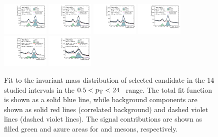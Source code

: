 \begin{figure}
    \includegraphics[width=0.2\textwidth]{Figures/Chapter 5/inv_mass/pt_4.5_5.0.pdf}
    \includegraphics[width=0.2\textwidth]{Figures/Chapter 5/inv_mass/pt_5.0_5.5.pdf}
    \includegraphics[width=0.2\textwidth]{Figures/Chapter 5/inv_mass/pt_5.5_6.0.pdf}
    \includegraphics[width=0.2\textwidth]{Figures/Chapter 5/inv_mass/pt_6.0_8.0.pdf}
    \includegraphics[width=0.2\textwidth]{Figures/Chapter 5/inv_mass/pt_8.0_12.0.pdf}
    \includegraphics[width=0.2\textwidth]{Figures/Chapter 5/inv_mass/pt_12.0_24.0.pdf}
    \caption{Fit to the invariant mass distribution of selected candidate in the 14 studied \pt intervals in the \mbox{$0.5<p_\mathrm{T}<24$~\gevc} range. The total fit function is shown as a solid blue line, while background components are shown as solid red lines (correlated background) and dashed violet lines (dashed violet lines). The signal contributions are shown as filled green and azure areas for \dpl and \ds mesons, respectively.}
    \label{fig:new_fit_all}
\end{figure}

